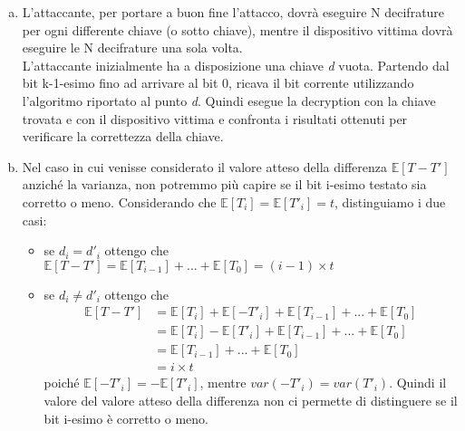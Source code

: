 \documentclass{article}
\begin{document}
\begin{enumerate}[(a)]
    \item L'attaccante, per portare a buon fine l'attacco, dovrà eseguire N decifrature per ogni     differente chiave (o sotto chiave), mentre il dispositivo vittima dovrà eseguire le N       decifrature una sola volta. \\
        L'attaccante inizialmente ha a disposizione una chiave \textit{d} vuota. Partendo dal bit k-1-esimo fino ad arrivare al bit 0, ricava il bit corrente utilizzando l'algoritmo riportato al punto \textit{d}. Quindi esegue la decryption con la chiave trovata e con il dispositivo vittima e confronta i risultati ottenuti per verificare la correttezza della chiave. \label{it:attackTheory}
    \item Nel caso in cui venisse considerato il valore atteso della differenza                     $\mathbb{E}[T-T']$ anziché la varianza, non potremmo più capire se il bit i-esimo           testato sia corretto o meno. Considerando che $\mathbb{E}[T_i] = \mathbb{E}[T'_i] = t$,     distinguiamo i due casi:
        \begin{itemize}
            \item se $d_i = d'_i$ ottengo che $\mathbb{E}[T-T'] = \mathbb{E}[T_{i-1}] + ... + \mathbb{E}[T_0] = (i-1) \times t$
            \item se $d_i \neq d'_i$ ottengo che 
                \begin{equation}
                \begin{split}
                    \mathbb{E}[T-T'] &= \mathbb{E}[T_i] + \mathbb{E}[-T'_i] + \mathbb{E}[T_{i-1}] + ... + \mathbb{E}[T_0] \\
                                     &= \mathbb{E}[T_i] - \mathbb{E}[T'_i] + \mathbb{E}[T_{i-1}] + ... + \mathbb{E}[T_0] \\
                                     &= \mathbb{E}[T_{i-1}] + ... + \mathbb{E}[T_0] \\
                                     &= i \times t
                \end{split}    
                \end{equation}  
                poiché $\mathbb{E}[-T'_i] = - \mathbb{E}[T'_i]$, mentre $var(-T'_i)=var(T'_i)$. Quindi il valore del valore atteso della differenza non ci permette di distinguere se il bit i-esimo è corretto o meno.
        \end{itemize}
\end{enumerate}
\end{document}
